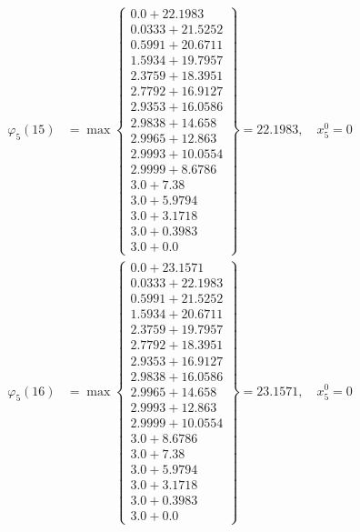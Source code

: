 \documentclass{article}
\begin{document}
\begin{align*}
  
\varphi_{5}(15) &= \max \left\{ \begin{array}{c}
0.0 + 22.1983 \\
 0.0333 + 21.5252 \\
 0.5991 + 20.6711 \\
 1.5934 + 19.7957 \\
 2.3759 + 18.3951 \\
 2.7792 + 16.9127 \\
 2.9353 + 16.0586 \\
 2.9838 + 14.658 \\
 2.9965 + 12.863 \\
 2.9993 + 10.0554 \\
 2.9999 + 8.6786 \\
 3.0 + 7.38 \\
 3.0 + 5.9794 \\
 3.0 + 3.1718 \\
 3.0 + 0.3983 \\
 3.0 + 0.0
\end{array} \right\}=22.1983,\quad x_{5}^0=0\\
  
  
  
  
\varphi_{5}(16) &= \max \left\{ \begin{array}{c}
0.0 + 23.1571 \\
 0.0333 + 22.1983 \\
 0.5991 + 21.5252 \\
 1.5934 + 20.6711 \\
 2.3759 + 19.7957 \\
 2.7792 + 18.3951 \\
 2.9353 + 16.9127 \\
 2.9838 + 16.0586 \\
 2.9965 + 14.658 \\
 2.9993 + 12.863 \\
 2.9999 + 10.0554 \\
 3.0 + 8.6786 \\
 3.0 + 7.38 \\
 3.0 + 5.9794 \\
 3.0 + 3.1718 \\
 3.0 + 0.3983 \\
 3.0 + 0.0
\end{array} \right\}=23.1571,\quad x_{5}^0=0\\
  
  
  

\end{align*}
\end{document}
